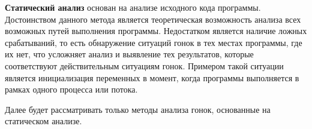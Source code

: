 \textbf{Статический анализ} основан на анализе исходного кода программы. Достоинством данного метода является теоретическая возможность анализа всех возможных путей выполнения программы.  Недостатком является наличие ложных срабатываний, то есть обнаружение ситуаций гонок в тех местах программы, где их нет, что усложняет анализ и выявление тех результатов, которые соответствуют действительным ситуациям гонок. Примером такой ситуации является инициализация переменных в момент, когда программы выполняется в рамках одного процесса или потока.

Далее будет рассматривать только методы анализа гонок, основанные на статическом анализе.
